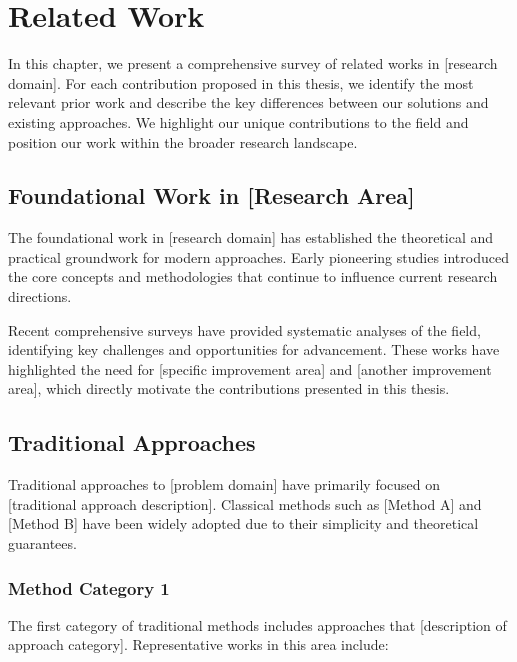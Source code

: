 \chapter{Related Work}
\label{chapter:relatedwork}

In this chapter, we present a comprehensive survey of related works in [research domain]. For each contribution proposed in this thesis, we identify the most relevant prior work and describe the key differences between our solutions and existing approaches. We highlight our unique contributions to the field and position our work within the broader research landscape.

\section{Foundational Work in [Research Area]}

The foundational work in [research domain] has established the theoretical and practical groundwork for modern approaches. Early pioneering studies \cite{example-reference-1, example-reference-2, example-reference-3} introduced the core concepts and methodologies that continue to influence current research directions.

\lipsum[1]

Recent comprehensive surveys \cite{example-reference-4, example-reference-5} have provided systematic analyses of the field, identifying key challenges and opportunities for advancement. These works have highlighted the need for [specific improvement area] and [another improvement area], which directly motivate the contributions presented in this thesis.

\section{Traditional Approaches}

Traditional approaches to [problem domain] have primarily focused on [traditional approach description]. Classical methods such as [Method A] \cite{example-reference-6} and [Method B] \cite{example-reference-7} have been widely adopted due to their simplicity and theoretical guarantees.

\subsection{Method Category 1}

The first category of traditional methods includes approaches that [description of approach category]. Representative works in this area include:


